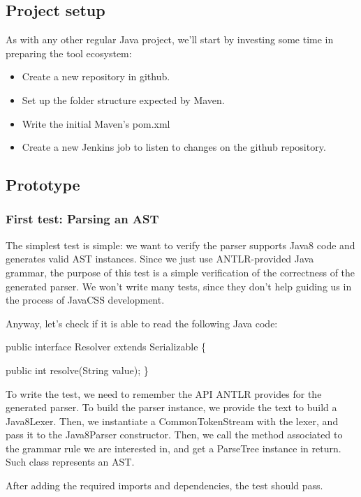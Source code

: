 \documentclass[11pt]{article}
\begin{document}
\subsection{Project setup}
\label{sec-1-2}

As with any other regular Java project, we'll start by investing some time in preparing the tool ecosystem:

\begin{itemize}
\item Create a new repository in github.
\item Set up the folder structure expected by Maven.
\item Write the initial Maven's pom.xml
\item Create a new Jenkins job to listen to changes on the github repository.
\end{itemize}

\subsection{Prototype}
\label{sec-1-3}

\subsubsection{First test: Parsing an AST}
\label{sec-1-3-1}

The simplest test is simple: we want to verify the parser supports Java8 code and generates valid AST instances.
Since we just use ANTLR-provided Java grammar, the purpose of this test is a simple verification of the correctness of
the generated parser. We won't write many tests, since they don't help guiding us in the process of JavaCSS development.

Anyway, let's check if it is able to read the following Java code:

public interface Resolver
    extends Serializable \{

    public int resolve(String value);
\}

To write the test, we need to remember the API ANTLR provides for the generated parser. To build the parser instance,
we provide the text to build a Java8Lexer. Then, we instantiate a CommonTokenStream with the lexer, and pass it to the Java8Parser constructor.
Then, we call the method associated to the grammar rule we are interested in, and
get a ParseTree instance in return. Such class represents an AST.

After adding the required imports and dependencies, the test should pass.
\end{document}
